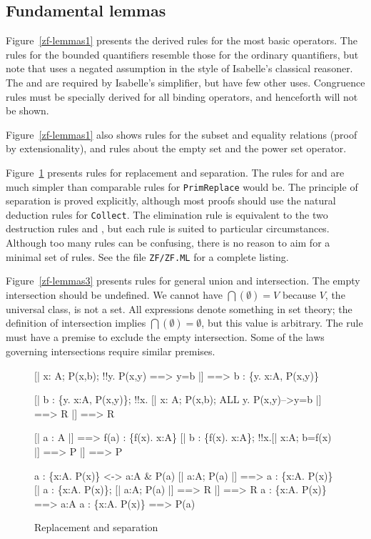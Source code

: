 \subsection{Fundamental lemmas}
Figure~\ref{zf-lemmas1} presents the derived rules for the most basic
operators.  The rules for the bounded quantifiers resemble those for the
ordinary quantifiers, but note that  uses a negated assumption
in the style of Isabelle's classical reasoner.  The   and  are required by Isabelle's
simplifier, but have few other uses.  Congruence rules must be specially
derived for all binding operators, and henceforth will not be shown.

Figure~\ref{zf-lemmas1} also shows rules for the subset and equality
relations (proof by extensionality), and rules about the empty set and the
power set operator.

Figure~\ref{zf-lemmas2} presents rules for replacement and separation.
The rules for  and  are much simpler than
comparable rules for {\tt PrimReplace} would be.  The principle of
separation is proved explicitly, although most proofs should use the
natural deduction rules for {\tt Collect}.  The elimination rule
 is equivalent to the two destruction rules
 and , but each rule is suited to
particular circumstances.  Although too many rules can be confusing, there
is no reason to aim for a minimal set of rules.  See the file
{\tt ZF/ZF.ML} for a complete listing.

Figure~\ref{zf-lemmas3} presents rules for general union and intersection.
The empty intersection should be undefined.  We cannot have
$\bigcap(\emptyset)=V$ because $V$, the universal class, is not a set.  All
expressions denote something in {\ZF} set theory; the definition of
intersection implies $\bigcap(\emptyset)=\emptyset$, but this value is
arbitrary.  The rule  must have a premise to exclude
the empty intersection.  Some of the laws governing intersections require
similar premises.


\begin{figure}[p]
\begin{ttbox}
      [| x: A;  P(x,b);  !!y. P(x,y) ==> y=b |] ==> 
              b : \{y. x:A, P(x,y)\}

      [| b : \{y. x:A, P(x,y)\};  
                 !!x. [| x: A;  P(x,b);  ALL y. P(x,y)-->y=b |] ==> R 
              |] ==> R

       [| a : A |] ==> f(a) : \{f(x). x:A\}
       [| b : \{f(x). x:A\};  
                 !!x.[| x:A;  b=f(x) |] ==> P |] ==> P

     a : \{x:A. P(x)\} <-> a:A & P(a)
       [| a:A;  P(a) |] ==> a : \{x:A. P(x)\}
       [| a : \{x:A. P(x)\};  [| a:A; P(a) |] ==> R |] ==> R
      a : \{x:A. P(x)\} ==> a:A
      a : \{x:A. P(x)\} ==> P(a)
\end{ttbox}
\caption{Replacement and separation} \label{zf-lemmas2}
\end{figure}


